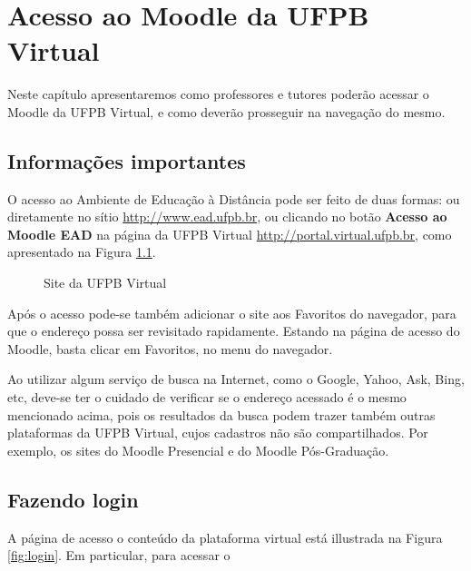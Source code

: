 \chapter{Acesso ao Moodle da UFPB Virtual}
Neste capítulo apresentaremos como professores e tutores poderão acessar o Moodle da UFPB Virtual, e como deverão prosseguir na navegação do mesmo.
\section{Informações importantes}
O acesso ao Ambiente de Educação à Distância pode ser feito de duas formas: ou diretamente no sítio \url{http://www.ead.ufpb.br}, ou 
clicando no botão \textbf{Acesso ao Moodle EAD} na página da UFPB Virtual \url{http://portal.virtual.ufpb.br}, como apresentado na Figura \ref{fig:apresentacao}.

\begin{figure}[htbp]
 \begin{center}
  \caption{Site da UFPB Virtual}
  \label{fig:apresentacao}
 \end{center}
\end{figure}

Após o acesso pode-se também adicionar o site aos Favoritos do navegador, para que o endereço possa ser revisitado rapidamente. 
Estando na página de acesso do Moodle, basta clicar em  Favoritos, no menu do navegador.

Ao utilizar algum serviço de busca na Internet, como o Google, Yahoo, Ask, Bing, etc, deve-se ter o cuidado de verificar se o endereço acessado é o mesmo mencionado acima, pois os resultados da busca podem trazer também outras plataformas da UFPB Virtual, cujos cadastros não são compartilhados. Por exemplo, os sites do Moodle Presencial e do Moodle Pós-Graduação.
\section{Fazendo login}
\label{chap2:sec:login}
A página de acesso o conteúdo da plataforma virtual está illustrada na Figura \ref{fig:login}. Em particular, para acessar o  


